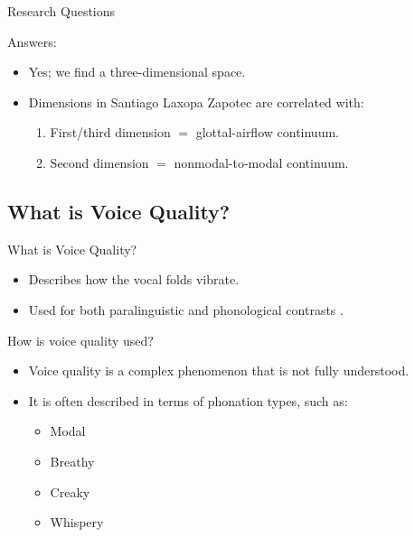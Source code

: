 \documentclass{beamer}
\begin{document}
\begin{frame}{Research Questions}
  \begin{block}{Answers:}
    \begin{itemize}
      \item Yes; we find a three-dimensional space.
      \item Dimensions in Santiago Laxopa Zapotec are correlated with:
      \begin{enumerate}
        \item First/third dimension $=$ glottal-airflow continuum. 
        \item Second dimension $=$ nonmodal-to-modal continuum.
      \end{enumerate}
    \end{itemize}  
  \end{block}
\end{frame}

\subsection{What is Voice Quality?}

\begin{frame}{What is Voice Quality?}
  \begin{itemize}
  \item
    Describes how the vocal folds vibrate.
  \item
    Used for both paralinguistic \citep[e.g.,][]{laverVoiceQualityIndexical1968,podesvaStanceWindowLanguageRace2016} and phonological contrasts \citep[e.g.,][]{espositoCrosslinguisticPatternsPhonation2020}.
  \end{itemize}
\end{frame}

\begin{frame}{How is voice quality used?}
  \begin{itemize}
    \item Voice quality is a complex phenomenon that is not fully understood.
    \item It is often described in terms of phonation types, such as:
    \begin{itemize}
      \item Modal
      \item Breathy
      \item Creaky
      \item Whispery
    \end{itemize}
  \end{itemize}
\end{frame}
\end{document}
